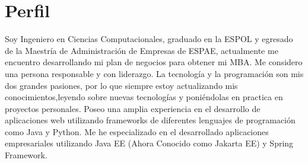 \section{Perfil}
Soy Ingeniero en Ciencias Computacionales, graduado en la ESPOL y egresado de la Maestría de Administración de Empresas de ESPAE, actualmente me encuentro desarrollando mi plan de negocios para obtener mi MBA.
Me considero una persona responsable y con liderazgo. La tecnología y la programación son mis dos grandes pasiones, por lo que siempre estoy actualizando mis conocimientos,leyendo sobre nuevas tecnologías y poniéndolas en practica en proyectos personales. Poseo una amplia experiencia en el  desarrollo de aplicaciones web utilizando  frameworks de diferentes lenguajes de programación como Java y Python.
Me he especializado en el desarrollado aplicaciones empresariales utilizando Java EE (Ahora Conocido como Jakarta EE) y Spring Framework.

